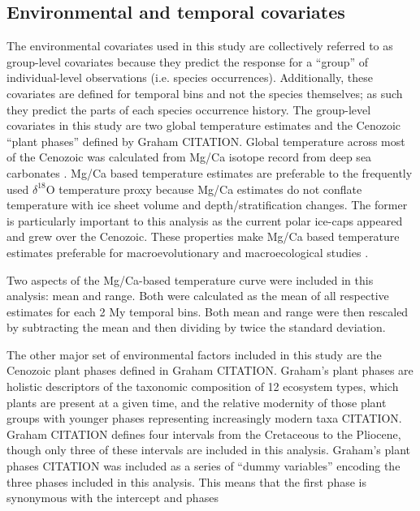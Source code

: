 \documentclass[12pt,letterpaper]{article}
\begin{document}
\subsection*{Environmental and temporal covariates}
The environmental covariates used in this study are collectively referred to as group-level covariates because they predict the response for a ``group'' of individual-level observations (i.e. species occurrences). Additionally, these covariates are defined for temporal bins and not the species themselves; as such they predict the parts of each species occurrence history. The group-level covariates in this study are two global temperature estimates and the Cenozoic ``plant phases'' defined by Graham CITATION. Global temperature across most of the Cenozoic was calculated from Mg/Ca isotope record from deep sea carbonates \citep{Cramer2011}. Mg/Ca based temperature estimates are preferable to the frequently used \(\delta^{18}\)O temperature proxy \citep{Zachos2001,Zachos2008,Alroy2000g,Figueirido2012} because Mg/Ca estimates do not conflate temperature with ice sheet volume and depth/stratification changes. The former is particularly important to this analysis as the current polar ice-caps appeared and grew over the Cenozoic. These properties make Mg/Ca based temperature estimates preferable for macroevolutionary and macroecological studies \citep{Ezard2016a}. 

Two aspects of the Mg/Ca-based temperature curve were included in this analysis: mean and range. Both were calculated as the mean of all respective estimates for each 2 My temporal bins. Both mean and range were then rescaled by subtracting the mean and then dividing by twice the standard deviation. 

The other major set of environmental factors included in this study are the Cenozoic plant phases defined in Graham CITATION. Graham's plant phases are holistic descriptors of the taxonomic composition of 12 ecosystem types, which plants are present at a given time, and the relative modernity of those plant groups with younger phases representing increasingly modern taxa CITATION. Graham CITATION defines four intervals from the Cretaceous to the Pliocene, though only three of these intervals are included in this analysis. Graham's plant phases CITATION was included as a series of ``dummy variables'' encoding the three phases included in this analysis. This means that the first phase is synonymous with the intercept and phases
\end{document}
